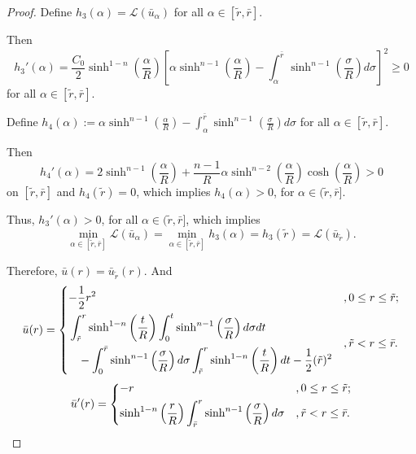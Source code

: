 \begin{proof}
	Define $h_3(\alpha) = \mathcal{L}(\bar{u}_{\alpha})$ for all $\alpha\in [\tilde{r}, \bar{r}]$. 
	
	Then $$h_3'(\alpha) = \frac{C_0}{2}\sinh^{1-n}\left(\frac{\alpha}{R}\right)\left[\alpha\sinh^{n-1}\left(\frac{\alpha}{R}\right)-\int_{\alpha}^{\bar{r}} \sinh^{n-1}\left(\frac{\sigma}{R}\right) d\sigma\right]^2 \ge 0$$ 
	for all $\alpha \in [\tilde{r}, \bar{r}].$
	 
	Define $h_4(\alpha):=\alpha \sinh^{n-1}(\frac{\alpha}{R})-\int_{\alpha}^{\bar{r}} \sinh^{n-1}(\frac{\sigma}{R}) d\sigma$ for all $\alpha \in [\tilde{r}, \bar{r}]$. 
	
	Then $$h_4'(\alpha)= 2\sinh^{n-1}\left(\frac{\alpha}{R}\right) +\frac{n-1}{R}\alpha  \sinh^{n-2}\left(\frac{\alpha}{R}\right) \cosh\left(\frac{\alpha}{R}\right) >0$$  
	on $[\tilde{r}, \bar{r}]$ and $h_4(\tilde{r})=0$, which implies $h_4(\alpha)> 0$, for $\alpha \in (\tilde{r}, \bar{r}]$. 
	
	Thus, $h_3'(\alpha)> 0$, for all $\alpha \in (\tilde{r}, \bar{r}]$, which implies
	\begin{equation*}
	\min\limits_{\alpha\in [\tilde{r}, \bar{r}]} \mathcal{L}(\bar{u}_{\alpha}) = \min\limits_{\alpha\in [\tilde{r}, \bar{r}]} h_3({\alpha}) = h_3(\tilde{r}) = \mathcal{L}(\bar{u}_{\tilde{r}}).
	\end{equation*}
	
	Therefore, $\bar{u}(r) = \bar{u}_{\tilde{r}}(r)$. And
	\begin{equation*}
	\bar{u}(r) =
	\begin{dcases}
	-\frac{1}{2} r^2 & ,0\le r\le \tilde{r}; \\
	\begin{split}
	&\int_{\tilde{r}}^{r}\sinh^{1-n}\left(\frac{t}{R}\right)\int_{0}^{t}\sinh^{n-1}\left(\frac{\sigma}{R}\right)d\sigma dt \\
	&\hspace{0.3cm}- \int_{0}^{\bar{r}}\sinh^{n-1}\left(\frac{\sigma }{R}\right)d \sigma  \int_{\tilde{r}}^{r}\sinh^{1-n}\left(\frac{t}{R}\right) d t -\frac{1}{2}(\tilde{r})^2
	\end{split}
	  & ,\tilde{r} < r \le \bar{r}. \\
	\end{dcases}
	\end{equation*}
	\begin{equation*}
	\bar{u}'(r) =
	\begin{dcases}
	- r & ,0\le r\le \tilde{r}; \\
	\sinh^{1-n}\left(\frac{r}{R}\right)\int_{\bar{r}}^r\sinh^{n-1}\left(\frac{\sigma}{R}\right)d\sigma    & ,\tilde{r} < r \le \bar{r}. \\
	\end{dcases}
	\end{equation*}
	

\end{proof}
